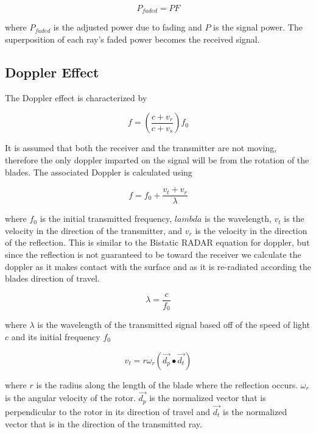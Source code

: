 \begin{equation}
	P_{faded} = PF
	\label{eqn:power_faded}
\end{equation}

where $P_{faded}$ is the adjusted power due to fading and $P$ is the signal power. The superposition of each ray's faded power becomes the received signal.

\subsection{Doppler Effect}
The Doppler effect is characterized by

\begin{equation}
	f = \left ( \frac{c + v_r}{c + v_s} \right ) f_0
	\label{eqn:formalDop}
\end{equation}

It is assumed that both the receiver and the transmitter are not moving, therefore the only doppler imparted on the signal will be from the rotation of the blades. The associated Doppler is calculated using

\begin{equation}
	f = f_0 + \frac{v_t + v_r}{\lambda} %
	\label{eqn:observedShift}	
\end{equation}

where $f_0$ is the initial transmitted frequency, $lambda$ is the wavelength, $v_t$ is the velocity in the direction of the transmitter, and $v_r$ is the velocity in the direction of the reflection. This is similar to the Bistatic RADAR equation for doppler, but since the reflection is not guaranteed to be toward the receiver we calculate the doppler as it makes contact with the surface and as it is re-radiated according the blades direction of travel.

\begin{equation}
	\lambda = \frac{c}{f_0}
	\label{eqn:wavelength}
\end{equation}

where $\lambda$ is the wavelength of the transmitted signal based off of the speed of light $c$ and its initial frequency $f_0$

\begin{equation}
	v_t = r \omega_r (\vec{d_p} \bullet \vec{d_t})
	\label{eqn:v_t}
\end{equation}

where $r$ is the radius along the length of the blade where the reflection occurs. $\omega_r$ is the angular velocity of the rotor. $\vec{d_p}$ is the normalized vector that is perpendicular to the rotor in its direction of travel and $\vec{d_t}$ is the normalized vector that is in the direction of the transmitted ray.


